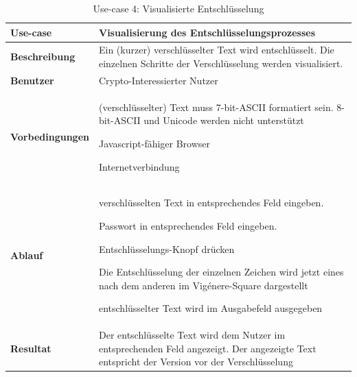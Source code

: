 \documentclass[11pt,paper=a4,final]{scrartcl}
\begin{document}
\begin{table}[h!]
  \centering
  \begin{tabular}{|l|p{12cm}|}\hline
    \bf Use-case & \bf Visualisierung des Entschl\"usselungsprozesses \\ \hline
    \bf Beschreibung & Ein (kurzer) verschl\"usselter Text wird entschl\"usselt.
    Die einzelnen Schritte der Verschl\"usselung werden visualisiert. \\ \hline
    \bf Benutzer & Crypto-Interessierter Nutzer \\ \hline
    \bf Vorbedingungen & \begin{itemize*} \item (verschl\"usselter) Text muss
    7-bit-ASCII formatiert sein. 8-bit-ASCII und Unicode werden nicht
    unterst\"utzt \item Javascript-f\"ahiger Browser \item Internetverbindung
    \end{itemize*} \\ \hline
    \bf Ablauf & \begin{itemize*} \item verschl\"usselten Text in entsprechendes
    Feld eingeben.  \item Passwort in entsprechendes Feld eingeben. \item
    Entschl\"usselungs-Knopf dr\"ucken \item Die Entschl\"usselung der einzelnen
    Zeichen wird jetzt eines nach dem anderen im Vig\'enere-Square dargestellt
    \item entschl\"usselter Text wird im Ausgabefeld ausgegeben \end{itemize*}
    \\ \hline
    \bf Resultat & Der entschl\"usselte Text wird dem Nutzer im entsprechenden
    Feld angezeigt. Der angezeigte Text entspricht der Version vor der
    Verschl\"usselung \\ \hline
  \end{tabular}
  \caption{Use-case 4: Visualisierte Entschl\"usselung}
  \label{tab:usecase4}
\end{table}
\end{document}
